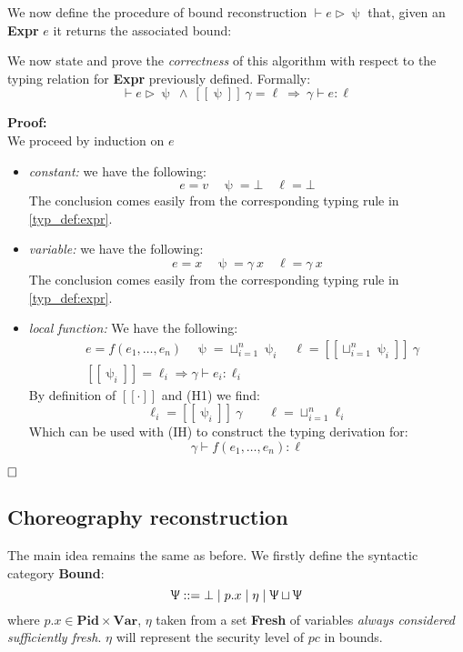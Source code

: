 \documentclass[12pt,a4paper,twoside]{book}
\newcommand{\llbracket}{[\![}
\newcommand{\rrbracket}{]\!]}
\newcommand{\qed}{\hfill\square}
\begin{document}
We now define the procedure of bound reconstruction $\vdash e \rhd \uppsi$ that, given an \textbf{Expr} $e$ it returns the associated bound:

We now state and prove the \emph{correctness} of this algorithm with respect to the typing relation for \textbf{Expr} previously defined. Formally:
\begin{equation}\label{rec:expr_corr}
\vdash e \rhd \uppsi~\land~\llbracket \uppsi \rrbracket~\gamma = \ell~\Longrightarrow~\gamma \vdash e: \ell
\end{equation}

\noindent\textbf{Proof:}\\
We proceed by induction on $e$
\begin{itemize}
\item \emph{constant:} we have the following:
$$
e=v\quad\uppsi=\bot\quad\ell=\bot
$$
The conclusion comes easily from the corresponding typing rule in \ref{typ_def:expr}.
\item \emph{variable:} we have the following:
$$
e=x\quad\uppsi=\gamma~x\quad\ell=\gamma~x
$$
The conclusion comes easily from the corresponding typing rule in \ref{typ_def:expr}.
\item \emph{local function:} We have the following:
\begin{align}
&e=f(e_1, \ldots, e_n)\quad\uppsi=\sqcup^n_{i=1}\uppsi_i
\quad \ell= \llbracket\sqcup^n_{i=1}\uppsi_i \rrbracket~\gamma \tag{H1}\\
&\llbracket \uppsi_i \rrbracket = \ell_i \Rightarrow \gamma \vdash e_i:\ell_i\tag{IH}
\end{align}
By definition of $\llbracket \cdot \rrbracket$ and (H1) we find:
$$
\ell_i = \llbracket \uppsi_i\rrbracket~\gamma \quad\quad \ell = \sqcup^n_{i=1}\ell_i
$$
Which can be used with (IH) to construct the typing derivation for:
$$
\gamma \vdash f(e_1, \ldots, e_n) : \ell
$$
\end{itemize}
$\qed$

\subsection{Choreography reconstruction}
The main idea remains the same as before.
We firstly define the syntactic category \textbf{Bound}:
$$
\Uppsi ::= \bot \mid p.x \mid \eta \mid \Uppsi \sqcup \Uppsi
$$
where $p.x \in \textbf{Pid} \times \textbf{Var}$, $\eta$ taken from a set \textbf{Fresh} of variables \emph{always considered sufficiently fresh}. $\eta$ will represent the security level of $pc$ in bounds.
\end{document}
